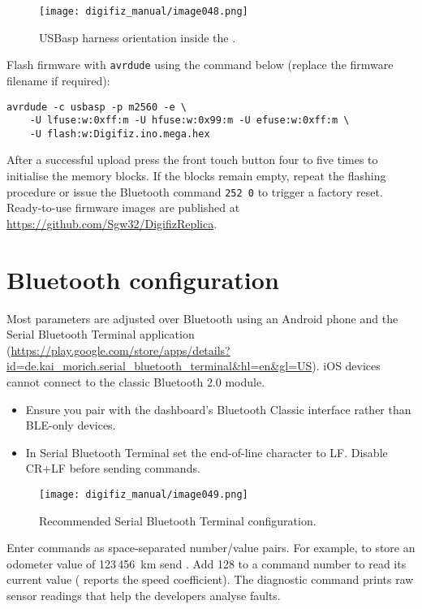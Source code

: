 \begin{figure}[htbp]
    \centering
    \texttt{[image: digifiz\_manual/image048.png]}
    \caption{USBasp harness orientation inside the \ReplicaGenOne{}.}
    \label{fig:usbasp-cable}
\end{figure}

Flash firmware with \texttt{avrdude} using the command below (replace the firmware filename if required):

\begin{verbatim}
avrdude -c usbasp -p m2560 -e \
    -U lfuse:w:0xff:m -U hfuse:w:0x99:m -U efuse:w:0xff:m \
    -U flash:w:Digifiz.ino.mega.hex
\end{verbatim}

After a successful upload press the front touch button four to five times to initialise the memory blocks. If the blocks remain empty, repeat the flashing procedure or issue the Bluetooth command \verb|252 0| to trigger a factory reset. Ready-to-use firmware images are published at \url{https://github.com/Sgw32/DigifizReplica}.

\section{Bluetooth configuration}
Most parameters are adjusted over Bluetooth using an Android phone and the Serial Bluetooth Terminal application (\url{https://play.google.com/store/apps/details?id=de.kai_morich.serial_bluetooth_terminal&hl=en&gl=US}). iOS devices cannot connect to the classic Bluetooth 2.0 module.

\begin{itemize}
    \item Ensure you pair with the dashboard's Bluetooth Classic interface rather than BLE-only devices.
    \item In Serial Bluetooth Terminal set the end-of-line character to LF. Disable CR+LF before sending commands.
\end{itemize}

\begin{figure}[htbp]
    \centering
    \texttt{[image: digifiz\_manual/image049.png]}
    \caption{Recommended Serial Bluetooth Terminal configuration.}
    \label{fig:sbt-settings}
\end{figure}

Enter commands as space-separated number/value pairs. For example, to store an odometer value of 123\,456~km send . Add 128 to a command number to read its current value ( reports the speed coefficient). The diagnostic command  prints raw sensor readings that help the developers analyse faults.

